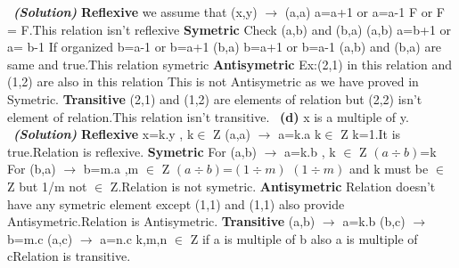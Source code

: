 \documentclass[a4 paper]{article}
\numberwithin{equation}{section}
\newcommand{\subproblem}[1]{~\newline\textbf{(#1)}}
\newcommand{\solution}{~\newline\textbf{\textit{(Solution)}} }
\newcommand{\0}{\mathbf{0}}
\begin{document}
\solution
\newline
\textbf{Reflexive}\newline
we assume that (x,y) $\rightarrow$  (a,a)\newline
a=a+1 or a=a-1  F or F = F.This relation isn't reflexive\newline
\textbf{Symetric}\newline
Check (a,b) and (b,a)\newline
(a,b)\newline
a=b+1 or a= b-1 If organized b=a-1 or b=a+1\newline
(b,a)\newline
b=a+1 or b=a-1\newline
(a,b) and (b,a) are same and true.This relation symetric\newline
\textbf{Antisymetric}\newline
Ex:(2,1) in this relation  and (1,2) are also in this relation\newline
This is not Antisymetric as we have proved in Symetric.\newline
\textbf{Transitive}\newline
(2,1) and (1,2) are elements of relation but (2,2) isn't element of relation.This relation isn't transitive.
\newline
\subproblem{d} x is a multiple of y.
\solution
\newline
\textbf{Reflexive}\newline
x=k.y , k$\in$ Z\newline
(a,a)  $\rightarrow$ a=k.a  k$\in$ Z   k=1.It is true.Relation is reflexive.\newline
\textbf{Symetric}\newline
For (a,b)  $\rightarrow$  a=k.b , k $\in$ Z    $(a\div b)$=k\newline
For (b,a)  $\rightarrow$  b=m.a ,m $\in$ Z    $(a\div b)$=$(1\div m)$ \newline
$(1\div m)$ and k must be $\in$ Z but 1/m not $\in$ Z.Relation is not symetric.\newline
\newline
\textbf{Antisymetric}\newline
Relation doesn't have any symetric element except (1,1) and (1,1) also provide Antisymetric.Relation is Antisymetric. \newline
\textbf{Transitive}\newline
(a,b) $\rightarrow$ a=k.b (b,c) $\rightarrow$ b=m.c  (a,c) $\rightarrow$ a=n.c k,m,n $\in$ Z if a is multiple of b also a is multiple of c\newline Relation is transitive.\newline
\end{document}
